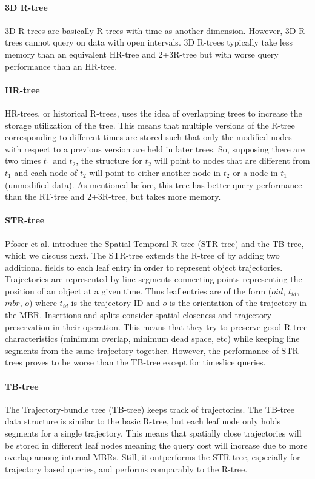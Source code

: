 \paragraph{3D R-tree} 3D R-trees \cite{nascimento1999evaluation} are basically
R-trees with time as another dimension. However, 3D R-trees cannot 
query on data with open intervals. 3D R-trees typically take less
memory than an equivalent HR-tree and 2+3R-tree but with worse query 
performance than an HR-tree.

\paragraph{HR-tree} HR-trees, or historical R-trees, 
\cite{nascimento1999evaluation} uses the idea of overlapping trees to 
increase the storage utilization of the tree. This means that multiple 
versions of the R-tree corresponding to different times are stored such 
that only the modified nodes with respect to a previous version are 
held in later trees. So, supposing there are two times $t_1$ and $t_2$, the
structure for $t_2$ will point to nodes that are different from $t_1$ and
each node of $t_2$ will point to either another node in $t_2$ or a node in
$t_1$ (unmodified data). As mentioned before, this tree has better query
performance than the RT-tree and 2+3R-tree, but takes more memory.

\paragraph{STR-tree} Pfoser et al. introduce the Spatial Temporal R-tree 
(STR-tree) and the TB-tree, which we discuss next\cite{pfoser2000novel}. 
The STR-tree extends the R-tree of \cite{guttman84} by adding two additional
fields to each leaf entry in order to represent object trajectories. 
Trajectories are represented by line segments connecting points representing
the position of an object at a given time. Thus leaf entries are of the 
form ($oid$, $t_{id}$, $mbr$, $o$) where $t_{id}$ is the trajectory ID and 
$o$ is the orientation of the trajectory in the MBR. Insertions and splits 
consider spatial closeness and trajectory preservation in their operation.
This means that they try to preserve good R-tree characteristics (minimum 
overlap, minimum dead space, etc) while keeping line segments from the 
same trajectory together. However, the performance of STR-trees proves to
be worse than the TB-tree except for timeslice queries.

\paragraph{TB-tree} The Trajectory-bundle tree (TB-tree) \cite{pfoser2000novel}
keeps track of trajectories. The TB-tree data structure is similar to the 
basic R-tree, but each leaf node only holds segments for a single 
trajectory. This means that spatially close trajectories will be stored in 
different leaf nodes meaning the query cost will increase due to more 
overlap among internal MBRs. Still, it outperforms the STR-tree, especially
for trajectory based queries, and performs comparably to the R-tree. 

